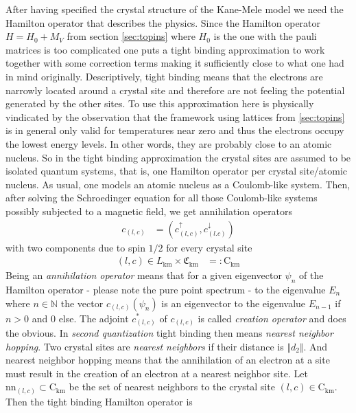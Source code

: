 After having specified the crystal structure of the Kane-Mele model we need the Hamilton operator that describes the physics. Since the Hamilton operator $H = H_{0} + M_{V}$ from section \ref{sec:topins} where $H_{0}$ is the one with the pauli matrices is too complicated one puts a {\glqq}tight binding approximation{\grqq} to work together with some correction terms making it sufficiently close to what one had in mind originally. Descriptively, tight binding means that the electrons are narrowly located around a crystal site and therefore are not feeling the potential generated by the other sites. To use this approximation here is physically vindicated by the observation that the framework using lattices from \ref{sec:topins} is in general only valid for temperatures near zero and thus the electrons occupy the lowest energy levels. In other words, they are probably close to an atomic nucleus. So in the tight binding approximation the crystal sites are assumed to be isolated quantum systems, that is, one Hamilton operator per crystal site/atomic nucleus. As usual, one models an atomic nucleus as a Coulomb-like system. Then, after solving the Schroedinger equation for all those Coulomb-like systems possibly subjected to a magnetic field, we get annihilation operators
\begin{align*}
  c_{(l,c)}
  &=
  (c_{(l,c)}^{\uparrow},c_{(l.c)}^{\downarrow})
\end{align*}
with two components due to spin $1/2$ for every crystal site \begin{align*}
  (l,c)
  \in
  L_{\textrm{km}}
  \times
  \mathfrak{C}_{\textrm{km}}
  &=:
  \mathrm{C}_{\textrm{km}}
\end{align*}
Being an \textit{annihilation operator} means that for a given eigenvector $\psi_{n}$ of the Hamilton operator - please note the pure point spectrum - to the eigenvalue $E_{n}$ where $n \in \mathbb{N}$ the vector $c_{(l,c)}(\psi_{n})$ is an eigenvector to the eigenvalue $E_{n-1}$ if $n > 0$ and $0$ else. The adjoint $c_{(l,c)}^{\ast}$ of $c_{(l,c)}$ is called \textit{creation operator} and does the obvious. In \textit{second quantization} tight binding then means \textit{nearest neighbor hopping}. Two crystal sites are \textit{nearest neighbors} if their distance is $\Vert d_{2} \Vert$. And nearest neighbor hopping means that the annihilation of an electron at a site must result in the creation of an electron at a nearest neighbor site. Let $\textrm{nn}_{(l,c)} \subset \mathrm{C}_{\textrm{km}}$ be the set of nearest neighbors to the crystal site $(l,c) \in \mathrm{C}_{\textrm{km}}$. Then the tight binding Hamilton operator is
